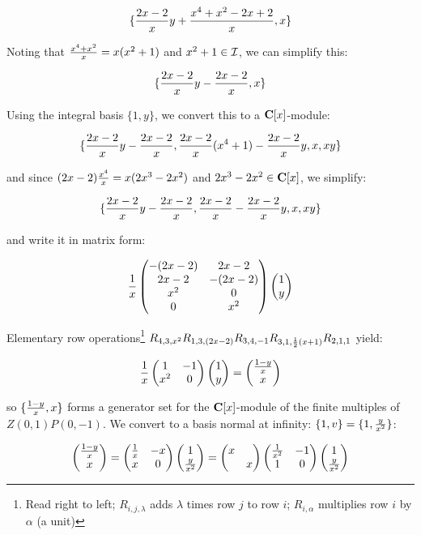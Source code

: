 $$\{ {{2x-2}\over x} y + {{x^4+x^2-2x+2}\over x}, x \}$$

Noting that ${{x^4+x^2}\over{x}} = x(x^2+1)$ and $x^2+1 \in {\cal I}$,
we can simplify this:

$$\{ {{2x-2}\over x} y - {{2x-2}\over x}, x \}$$

\vfill\eject

Using the integral basis $\{1, y \}$, we convert this to a
${\bf C}[x]$-module:

$$\{ {{2x-2}\over x} y - {{2x-2}\over x}, {{2x-2}\over x} (x^4+1) - {{2x-2}\over x} y, x, xy \}$$

and since $(2x-2){{x^4}\over{x}} = x(2x^3-2x^2)$ and
$2x^3-2x^2 \in {\bf C}[x]$, we simplify:

$$\{ {{2x-2}\over x} y - {{2x-2}\over x}, {{2x-2}\over x} - {{2x-2}\over x} y, x, xy \}$$

and write it in matrix form:


$${1\over x}\begin{pmatrix}-(2x-2) & 2x-2 \cr 2x-2 & -(2x-2) \cr x^2 & 0 \cr 0 & x^2\end{pmatrix} \begin{pmatrix}1 \cr y\end{pmatrix}$$

Elementary row operations\footnote{Read right to left; $R_{i,j,\lambda}$ adds $\lambda$ times row $j$ to row $i$; $R_{i,\alpha}$ multiplies row $i$ by $\alpha$ (a unit)} $R_{4,3,x^2} R_{1,3,(2x-2)} R_{3,4,-1} R_{3,1,{1\over2}(x+1)} R_{2,1,1} $ yield:

$${1\over x}\begin{pmatrix}1 & -1 \cr x^2 & 0\end{pmatrix} \begin{pmatrix}1 \cr y\end{pmatrix} = \begin{pmatrix}{{1-y}\over{x}} \cr x\end{pmatrix} $$

so $\{ {{1-y}\over{x}}, x \} $ forms a generator set for
the ${\bf C}[x]$-module of the finite multiples of $Z(0,1)P(0,-1)$.
We convert to a basis normal at infinity: $\{1, v\} = \{1, {y\over x^2}\}$:

$$\begin{pmatrix}{{1-y}\over{x}} \cr x\end{pmatrix} = \begin{pmatrix}{1\over x} & -x \cr x & 0\end{pmatrix} \begin{pmatrix}1 \cr {y\over x^2}\end{pmatrix}
= \begin{pmatrix}x & \cr & x\end{pmatrix} \begin{pmatrix}{1\over x^2} & -1 \cr 1 & 0\end{pmatrix} \begin{pmatrix}1 \cr {y\over x^2}\end{pmatrix}$$

